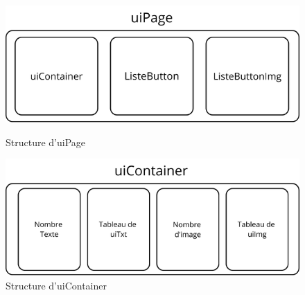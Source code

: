 \documentclass[11pt,a4paper]{article}
\begin{document}
\begin{figure}[h] 
    \begin{minipage}{0.48\textwidth} 
        \centering
        \includegraphics[width=\textwidth]{img/page_schema.png} 
        \caption{Structure d'uiPage} 
    \end{minipage} 
    \hfill 
    \begin{minipage}{0.48\textwidth} 
        \centering 
        \includegraphics[width=\textwidth]{img/uiContainer_schema.png} 
        \caption{Structure d'uiContainer}
    \end{minipage} 
\end{figure}
\end{document}
